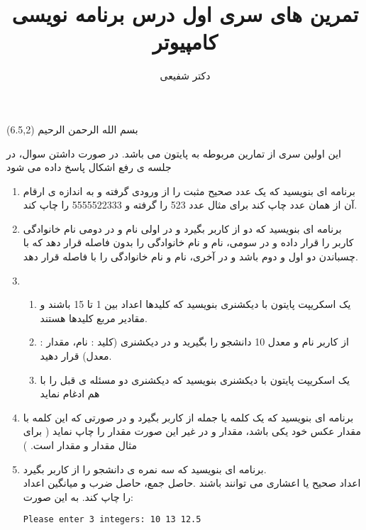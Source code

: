 \documentclass[oneside]{article}
\title{تمرین های سری اول درس برنامه نویسی کامپیوتر}
\author{دکتر شفیعی}
\begin{document}
\maketitle

\begin{textblock}{5}(6.5,2)\nastaliqfont
\noindent\Large
بسم الله الرحمن الرحیم
\end{textblock}
\begin{tcolorbox}
\begin{center}
این اولین سری از تمارین مربوطه به پایتون می باشد. در صورت داشتن سوال، در جلسه ی رفع اشکال پاسخ داده می شود 
\end{center}
\end{tcolorbox}

\begin{enumerate}
\item 
برنامه ای بنویسید که  یک عدد صحیح مثبت را از ورودی گرفته و به اندازه ی ارقام آن از همان عدد چاپ کند برای مثال عدد 523 را گرفته و 5555522333 را چاپ کند. 
\item
برنامه ای بنویسید که دو 
 از کاربر بگیرد و در اولی نام و در دومی نام خانوادگی کاربر را قرار داده
 و در 
 سومی، نام و نام خانوادگی را بدون فاصله قرار دهد که با چسباندن دو 
اول و دوم باشد و در 
 آخری، 
 نام و نام خانوادگی را با فاصله قرار دهد.
\item
\begin{enumerate}
\item 
یک اسکریپت پایتون با دیکشنری بنویسید که کلیدها اعداد بین 1 تا 15 باشند و مقادیر مربع کلیدها هستند.
\item
از کاربر نام و معدل 10 دانشجو را بگیرید و در دیکشنری (کلید : نام، مقدار : معدل) قرار دهید.
\item
یک اسکریپت پایتون با دیکشنری بنویسید که دیکشنری دو مسئله ی قبل را با هم ادغام نماید
\end{enumerate}
\item 
برنامه ای بنویسید که یک کلمه یا جمله
از کاربر بگیرد و در صورتی که این
کلمه با مقدار عکس خود یکی باشد، مقدار 
و در غیر این صورت مقدار
را چاپ نماید
(
برای مثال 
مقدار 
و 
مقدار
است.
)
\item
برنامه ای بنویسید که سه نمره ی دانشجو را از کاربر بگیرد.
\\
اعداد صحیح یا اعشاری می توانند باشند .حاصل جمع، حاصل ضرب و میانگین اعداد را چاپ کند. به این صورت:
\\
\begin{latin}
\texttt{Please enter 3 integers: 10 13 12.5} \\

\end{latin}
\end{enumerate}
\end{document}
